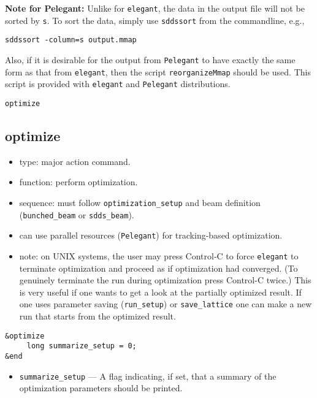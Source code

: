 \documentclass[11pt]{article}
\begin{document}
{\bf Note for Pelegant:} Unlike for {\tt elegant}, the data in the output file will not be sorted by \verb|s|.
To sort the data, simply use \verb|sddssort| from the commandline, e.g.,
\begin{verbatim}
sddssort -column=s output.mmap
\end{verbatim}
Also, if it is desirable for the output from \verb|Pelegant| to have exactly the same form as that from 
\verb|elegant|, then the script \verb|reorganizeMmap| should be used. This script is provided with 
\verb|elegant| and \verb|Pelegant| distributions.

\newpage
\begin{center}{\Large\verb|optimize|}\end{center}
\subsection{optimize \label{subsec:optimize}}

\begin{itemize}
\item type: major action command.
\item function: perform optimization.
\item sequence: must follow \verb|optimization_setup| and beam definition (\verb|bunched_beam| or \verb|sdds_beam|).
\item can use parallel resources (\verb|Pelegant|) for tracking-based optimization.
\item note: on UNIX systems, the user may press Control-C to force
\verb|elegant| to terminate optimization and proceed as if
optimization had converged.  (To genuinely terminate the run during
optimization press Control-C twice.) This is very useful if one wants
to get a look at the partially optimized result.  If one uses parameter
saving (\verb|run_setup|) or \verb|save_lattice| one can make a new
run that starts from the optimized result.

\end{itemize}

\begin{verbatim}
&optimize
     long summarize_setup = 0;
&end
\end{verbatim}

\begin{itemize}

\item \verb|summarize_setup| --- A flag indicating, if set, that a
summary of the optimization parameters should be printed.
\end{itemize}
\end{document}
